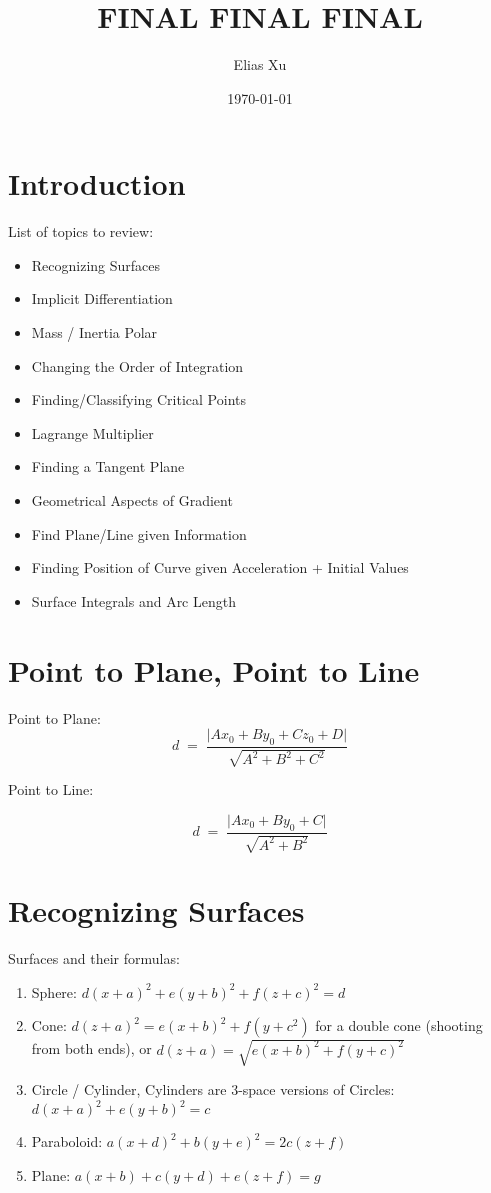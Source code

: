 \documentclass{article}
\begin{document}
\title{FINAL FINAL FINAL}
\author{Elias Xu}
\date{\today}
\maketitle

\tableofcontents

\setlength{\parindent}{0pt}

\section{Introduction}

List of topics to review:

\begin{itemize}
    \item Recognizing Surfaces
    \item Implicit Differentiation
    \item Mass / Inertia Polar
    \item Changing the Order of Integration
    \item Finding/Classifying Critical Points
    \item Lagrange Multiplier
    \item Finding a Tangent Plane
    \item Geometrical Aspects of Gradient
    \item Find Plane/Line given Information
    \item Finding Position of Curve given Acceleration + Initial Values
    \item Surface Integrals and Arc Length
\end{itemize}

\section{Point to Plane, Point to Line}

Point to Plane:
\[
d \;=\; \frac{\bigl|A x_0 + B y_0 + C z_0 + D\bigr|}{\sqrt{A^2 + B^2 + C^2}}
\]

Point to Line:

\[
d \;=\; \frac{\bigl|A x_0 + B y_0 + C\bigr|}{\sqrt{A^2 + B^2}}
\]


\section{Recognizing Surfaces}

Surfaces and their formulas:

\begin{enumerate}
    \item Sphere: $d(x+a)^2 + e(y+b)^2 + f(z+c)^2 = d$
    \item Cone: $d(z+a)^2 = e(x+b)^2 + f(y+c^2)$ for a double cone (shooting from both ends), or $d(z+a)=\sqrt{e(x+b)^2 + f(y+c)^2}$
    \item Circle / Cylinder, Cylinders are 3-space versions of Circles: $d(x+a)^2 + e(y+b)^2 = c$
    \item Paraboloid: $a(x+d)^2 + b(y+e)^2 = 2c(z+f)$
    \item Plane: $a(x+b) + c(y+d) + e(z+f) = g$
\end{enumerate}
\end{document}
